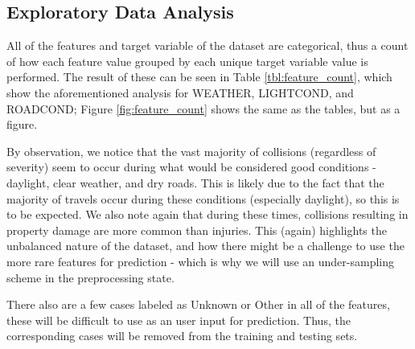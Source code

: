 \documentclass[12pt,a4paper,oneside]{article}
\begin{document}
\subsection{Exploratory Data Analysis}

All of the features and target variable of the dataset are categorical, thus a count of how each feature value grouped by each unique target variable value is performed.
The result of these can be seen in Table \ref{tbl:feature_count}, which show the aforementioned analysis for WEATHER, LIGHTCOND, and ROADCOND; Figure \ref{fig:feature_count} shows the same as the tables, but as a figure.

By observation, we notice that the vast majority of collisions (regardless of severity) seem to occur during what would be considered good conditions - daylight, clear weather, and dry roads. 
This is likely due to the fact that the majority of travels occur during these conditions (especially daylight), so this is to be expected. 
We also note again that during these times, collisions resulting in property damage are more common than injuries. 
This (again) highlights the unbalanced nature of the dataset, and how there might be a challenge to use the more rare features for prediction - which is why we will use an under-sampling scheme in the preprocessing state.

There also are a few cases labeled as Unknown or Other in all of the features, these will be difficult to use as an user input for prediction. 
Thus, the corresponding cases will be removed from the training and testing sets. 
\end{document}
